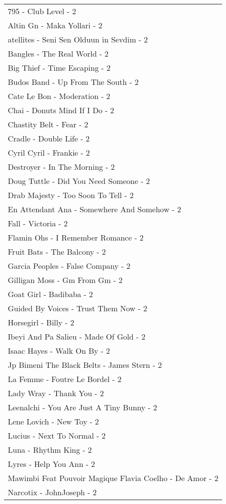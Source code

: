 \documentclass[
]{article}
\begin{document}
\begin{longtable}{l}
795 - Club Level - 2 \\ 
Altin Gn - Maka Yollari - 2 \\ 
atellites - Seni Sen Olduun in Sevdim - 2 \\ 
Bangles - The Real World - 2 \\ 
Big Thief - Time Escaping - 2 \\ 
Budos Band - Up From The South - 2 \\ 
Cate Le Bon - Moderation - 2 \\ 
Chai - Donuts Mind If I Do - 2 \\ 
Chastity Belt - Fear - 2 \\ 
Cradle - Double Life - 2 \\ 
Cyril Cyril - Frankie - 2 \\ 
Destroyer - In The Morning - 2 \\ 
Doug Tuttle - Did You Need Someone - 2 \\ 
Drab Majesty - Too Soon To Tell - 2 \\ 
En Attendant Ana - Somewhere And Somehow - 2 \\ 
Fall - Victoria - 2 \\ 
Flamin Ohs - I Remember Romance - 2 \\ 
Fruit Bats - The Balcony - 2 \\ 
Garcia Peoples - False Company - 2 \\ 
Gilligan Moss - Gm From Gm - 2 \\ 
Goat Girl - Badibaba - 2 \\ 
Guided By Voices - Trust Them Now - 2 \\ 
Horsegirl - Billy - 2 \\ 
Ibeyi And Pa Salieu - Made Of Gold - 2 \\ 
Isaac Hayes - Walk On By - 2 \\ 
Jp Bimeni The Black Belts - James Stern - 2 \\ 
La Femme - Foutre Le Bordel - 2 \\ 
Lady Wray - Thank You - 2 \\ 
Leenalchi - You Are Just A Tiny Bunny - 2 \\ 
Lene Lovich - New Toy - 2 \\ 
Lucius - Next To Normal - 2 \\ 
Luna - Rhythm King - 2 \\ 
Lyres - Help You Ann - 2 \\ 
Mawimbi Feat Pouvoir Magique Flavia Coelho - De Amor - 2 \\ 
Narcotix - JohnJoseph - 2 \\ 

\end{longtable}
\end{document}
